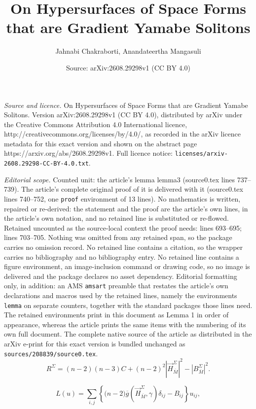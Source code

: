 \documentclass[10pt,a4paper]{amsart}
\title{On Hypersurfaces of Space Forms that are Gradient Yamabe Solitons}
\author{Jahnabi Chakraborti, Anandateertha Mangasuli}
\date{Source: arXiv:2608.29298v1 (CC BY 4.0)}
\begin{document}
\maketitle

\noindent\emph{Source and licence.} On Hypersurfaces of Space Forms that are Gradient Yamabe Solitons. Version arXiv:2608.29298v1 (CC BY 4.0), distributed by arXiv under the Creative Commons Attribution 4.0 International licence, http://creativecommons.org/licenses/by/4.0/, as recorded in the arXiv licence metadata for this exact version and shown on the abstract page https://arxiv.org/abs/2608.29298v1. Full licence notice: \texttt{licenses/arxiv-2608.29298-CC-BY-4.0.txt}.\par\smallskip

\noindent\textit{Editorial scope.} Counted unit: the article's lemma lemma3 (source0.tex lines 737--739). The article's complete original proof of it is delivered with it (source0.tex lines 740--752, one \texttt{proof} environment of 13 lines). No mathematics is written, repaired or re-derived: the statement and the proof are the article's own lines, in the article's own notation, and no retained line is substituted or re-flowed.  Retained uncounted as the source-local context the proof needs: lines 693--695; lines 703--705.  Nothing was omitted from any retained span, so the package carries no omission record.  No retained line contains a citation, so the wrapper carries no bibliography and no bibliography entry.  No retained line contains a figure environment, an image-inclusion command or drawing code, so no image is delivered and the package declares no asset dependency.  Editorial formatting only, in addition: an AMS \texttt{amsart} preamble that restates the article's own declarations and macros used by the retained lines, namely the environments \texttt{lemma} on separate counters, together with the standard packages those lines need.  The retained environments print in this document as Lemma 1 in order of appearance, whereas the article prints the same items with the numbering of its own full document.  The complete native source of the article as distributed in the arXiv e-print for this exact version is bundled unchanged as \texttt{sources/208839/source0.tex}.
\begin{equation}\label{FE4}
    R^{\Sigma}=(n-2)(n-3)C+(n-2)^2 \left|\vec{H}^{\Sigma}_{\overline{M}}\right|^2-\left|B^{\Sigma}_{\overline{M}}\right|^2.
\end{equation}

\begin{equation}\label{FE6}
    L(u)=\sum_{i, j} \left\{\big(n-2)\overline{g}\left(\vec{H}^{\Sigma}_{\overline{M}}, \gamma \right)\delta_{ij}-B_{ij}\right\} u_{ij},
\end{equation}
\end{document}
